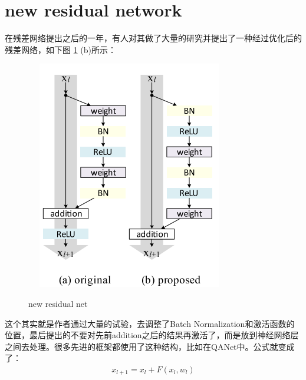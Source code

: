 \documentclass[12pt]{ctexart}%
\begin{document}
	\section{\quad new residual network}
		在残差网络提出之后的一年，有人对其做了大量的研究并提出了一种经过优化后的残差网络，如下图 \ref{fig18:new_residual_net} (b)所示：
			\begin{figure}[H]
				\vspace{-0.2cm}  %
				\setlength{\abovecaptionskip}{-0.2cm}   %
				\centering
				\includegraphics[scale=0.8]{new_residual_net.png}
				\renewcommand{\figurename}{Fig} %
				\caption{new residual net}
				\label{fig18:new_residual_net}
			\end{figure}
		这个其实就是作者通过大量的试验，去调整了Batch Normalization和激活函数的位置，最后提出的不要对先前addition之后的结果再激活了，而是放到神经网络层之间去处理。很多先进的框架都使用了这种结构，比如在QANet中。公式就变成了：
			\begin{align}
				x_{l+1} = x_l + F(x_l, w_l)
			\end{align}
			
\end{document}
